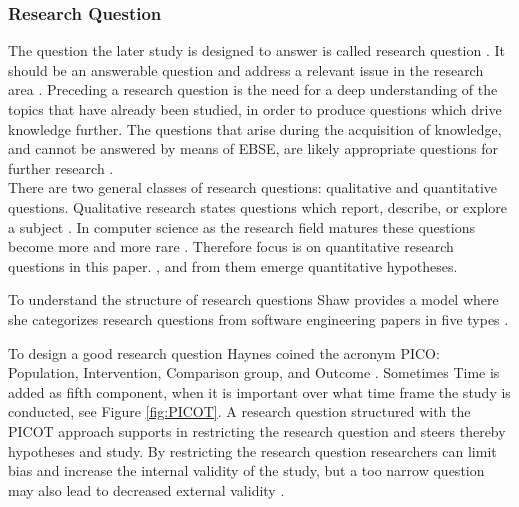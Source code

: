 
\subsubsection{Research Question}

The question the later study is designed to answer is called research question \cite{Vickers}. It should be an answerable question and address a relevant issue in the research area \cite{Dyba2005}. Preceding a research question is the need for a deep understanding of the topics that have already been studied, in order to produce questions which drive knowledge further. The questions that arise during the acquisition of knowledge, and cannot be answered by means of EBSE, are likely appropriate questions for further research \cite{Farrugia2009}. \\
There are two general classes of research questions: qualitative and quantitative questions. Qualitative research states questions which report, describe, or explore a subject \cite[p. 139-141]{Creswell2014}. In computer science as the research field matures these questions become more and more rare . Therefore focus is on quantitative research questions in this paper.  \cite[p. 143]{Creswell2014}, and from them emerge quantitative hypotheses.

To understand the structure of research questions Shaw provides a model where she categorizes research questions from software engineering papers in five types \cite{Shaw2002} . 

To design a good research question Haynes coined the acronym PICO: Population, Intervention, Comparison group, and Outcome \cite{BrianHaynes2006}. Sometimes Time is added as fifth component, when it is important over what time frame the study is conducted, see Figure \ref{fig:PICOT}. A research question structured with the PICOT approach supports in restricting the research question and steers thereby hypotheses and study. By restricting the research question researchers can limit bias and increase the internal validity of the study, but a too narrow question may also lead to decreased external validity \cite{Farrugia2009}. 

